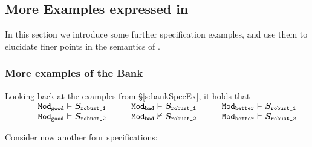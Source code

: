 \subsection{More Examples expressed in \Nec}
\label{s:expressiveness}

In this section we introduce some further specification examples, and use them to elucidate finer points
in the semantics of \Nec. %

 \subsubsection{More examples of the Bank}
Looking back at the examples from  \S\ref{s:bankSpecEx},   it holds that
  \\
  $\begin{array}{llll}
  \ \  \ \ \ \ \ & \ModA \vDash  \SrobustA    \ \ \ \ \ \ & \ModB \vDash \SrobustA \ \ \ \ \ \
  &  \ModC \vDash \SrobustA
  \\
 &  \ModA \vDash  \SrobustB    \ \ \ \ \ & \ModB \nvDash \SrobustB \ \ \ \ \ 
  &  \ModC \vDash \SrobustB
  \end{array}$
 
 

 
Consider now another four \Nec specifications:
 
